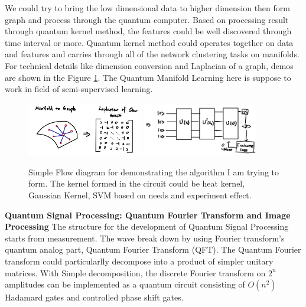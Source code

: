\documentclass{article}
\begin{document}
We could try to bring the low dimensional data to higher dimension 
then form graph and process through the quantum computer. 
Based on processing 
result through quantum kernel method, the features could be well 
discovered through time interval or more.
 Quantum kernel method could operates together 
on data and features 
and carries through all of the network clustering tasks on 
manifolds. For technical details like dimension conversion and Laplacian 
of a graph, demos are shown in the Figure \ref*{ppp}. The Quantum Manifold 
Learning here is suppose to work in field of semi-supervised learning. 

\begin{figure}[h]
  \begin{center}
    \includegraphics[width=0.45\textwidth]{manifold0.png}
    \includegraphics[width=0.45\textwidth]{qkernel.png}
  \end{center}
  \caption{
  Simple Flow diagram for demonstrating the algorithm I am 
  trying to form. The kernel formed in the circuit could 
  be heat kernel, Gaussian Kernel, SVM based on needs 
  and experiment effect. 
  \cite{manifold2}}
  \label{ppp}
\end{figure}

\textbf{Quantum Signal Processing: Quantum Fourier Transform and Image Processing}\newline
The structure for the development of Quantum Signal Processing starts from
measurement. The wave break down by using Fourier transform's quantum analog
part, Quantum Fourier Transform (QFT). The Quantum Fourier transform could
particularlly decompose into a product of simpler unitary matrices.
With Simple decomposition, the discrete Fourier transform on $2^n$ amplitudes
can be implemented as a quantum circuit consisting of $O(n^2)$ Hadamard
gates and controlled phase shift gates. 
\end{document}
